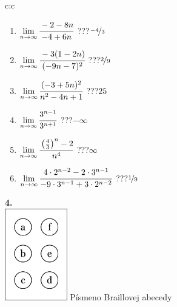 \documentclass[10pt]{report}
\begin{document}
\begin{tabular}{c:c}
\begin{minipage}[c][104.5mm][t]{0.5\linewidth}
\begin{center}
\begin{minipage}{0.79\linewidth}
\begin{center}
\begin{varwidth}{\linewidth}
\begin{enumerate}
\normalsize
\item $\lim\limits_{n\to\infty}\cfrac{-2-8n}{-4+6n}$\quad \dotfill\; ???\;\dotfill \quad $\nicefrac{-4}{3}$
\item $\lim\limits_{n\to\infty}\cfrac{-3(1-2n)}{(-9n-7)^2}$\quad \dotfill\; ???\;\dotfill \quad $\nicefrac{2}{9}$
\item $\lim\limits_{n\to\infty}\cfrac{(-3+5n)^2}{n^2-4n+1}$\quad \dotfill\; ???\;\dotfill \quad $25$
\item $\lim\limits_{n\to\infty}\cfrac{3^{n-1}}{3^{n+1}}$\quad \dotfill\; ???\;\dotfill \quad $-\infty$
\item $\lim\limits_{n\to\infty}\cfrac{\left(\frac{4}{3}\right)^n -2}{n^{4}}$\quad \dotfill\; ???\;\dotfill \quad $\infty$
\item $\lim\limits_{n\to\infty}\cfrac{4\cdot 2^{n-2}-2\cdot 3^{n-1}}{-9\cdot 3^{n-1}+3\cdot 2^{n-2}}$\quad \dotfill\; ???\;\dotfill \quad $\nicefrac{1}{9}$
\end{enumerate}
\end{varwidth}
\end{center}
\end{minipage}
\begin{minipage}{0.20\linewidth}
\begin{center}
{\Huge\bfseries 4.} \\[2mm]
\includegraphics[height=40mm]{../images/braille.png}
{\small Písmeno Braillovej abecedy}
\end{center}
\end{minipage}
\end{center}
\end{minipage}
%
\end{tabular}
\newpage
\thispagestyle{empty}
\end{document}
